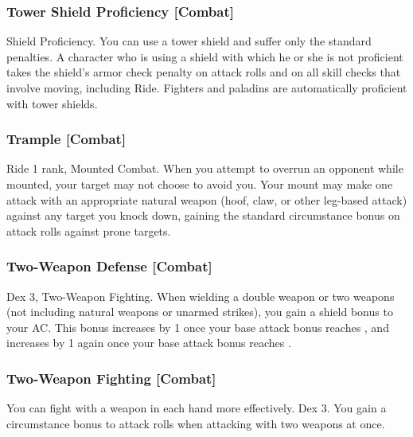 \subsubsection{Tower Shield Proficiency [Combat]}
 Shield Proficiency.
 You can use a tower shield and suffer only the standard penalties.
 A character who is using a shield with which he or she is not proficient takes the shield's armor check penalty on attack rolls and on all skill checks that involve moving, including Ride.
 Fighters and paladins are automatically proficient with tower shields.

\subsubsection{Trample [Combat]}
 Ride 1 rank, Mounted Combat.
 When you attempt to overrun an opponent while mounted, your target may not choose to avoid you. Your mount may make one attack with an appropriate natural weapon (hoof, claw, or other leg-based attack) against any target you knock down, gaining the standard  circumstance bonus on attack rolls against prone targets.

\subsubsection{Two-Weapon Defense [Combat]}
 Dex 3, Two-Weapon Fighting.
 When wielding a double weapon or two weapons (not including natural weapons or unarmed strikes), you gain a  shield bonus to your AC. This bonus increases by 1 once your base attack bonus reaches , and increases by 1 again once your base attack bonus reaches .

\subsubsection{Two-Weapon Fighting [Combat]}
You can fight with a weapon in each hand more effectively.
 Dex 3.
 You gain a  circumstance bonus to attack rolls when attacking with two weapons at once.

